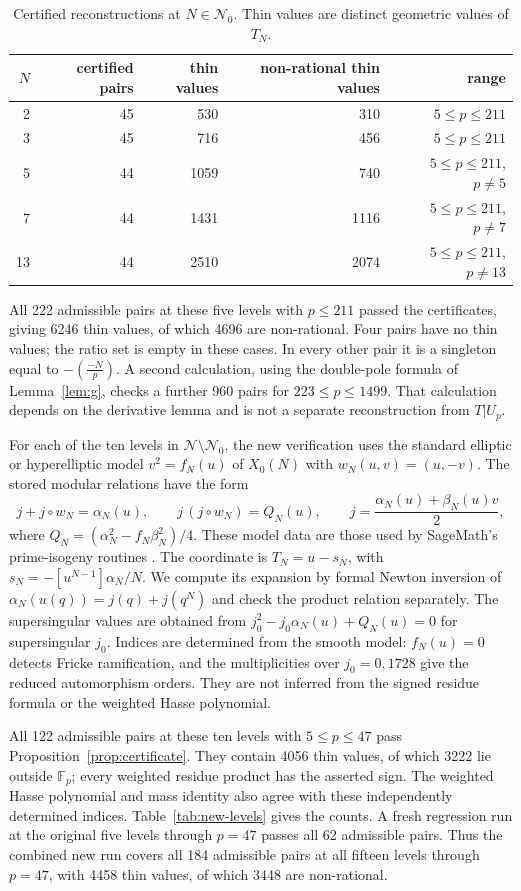 \documentclass[11pt,a4paper]{article}
\numberwithin{equation}{section}
\theoremstyle{definition}
\theoremstyle{remark}
\newcommand{\Fp}{\mathbb F_p}
\begin{document}
\begin{table}[ht]\centering
\begin{tabular}{rrrrr}\toprule
$N$ & certified pairs & thin values & non-rational thin values & range\\\midrule
2 & 45 & 530 & 310 & $5\le p\le211$\\
3 & 45 & 716 & 456 & $5\le p\le211$\\
5 & 44 & 1059 & 740 & $5\le p\le211$, $p\ne5$\\
7 & 44 & 1431 & 1116 & $5\le p\le211$, $p\ne7$\\
13 & 44 & 2510 & 2074 & $5\le p\le211$, $p\ne13$\\\bottomrule
\end{tabular}
\caption{Certified reconstructions at $N\in\mathcal N_0$.
Thin values are distinct geometric values of $T_N$.}
\end{table}

All 222 admissible pairs at these five levels with $p\le211$ passed the certificates, giving 6246 thin
values, of which 4696 are non-rational. Four pairs have no thin values; the ratio
set is empty in these cases. In every other pair it is a singleton equal to
$-\left(\frac{-N}{p}\right)$. A second calculation, using the double-pole formula
of Lemma~\ref{lem:g}, checks a further 960 pairs for $223\le p\le1499$.
That calculation depends on the derivative lemma and is not a separate
reconstruction from $T|U_p$.

For each of the ten levels in $\mathcal N\setminus\mathcal N_0$,
the new verification uses the standard elliptic or hyperelliptic model
$v^2=f_N(u)$ of $X_0(N)$ with $w_N(u,v)=(u,-v)$.
The stored modular relations have the form
\[
j+j\circ w_N=\alpha_N(u),\qquad
j\,(j\circ w_N)=Q_N(u),\qquad
j=\frac{\alpha_N(u)+\beta_N(u)v}{2},
\]
where $Q_N=(\alpha_N^2-f_N\beta_N^2)/4$.
These model data are those used by SageMath's prime-isogeny routines
\citep{SageModels}. The coordinate is $T_N=u-s_N$, with
$s_N=-[u^{N-1}]\alpha_N/N$.
We compute its expansion by formal Newton inversion of
$\alpha_N(u(q))=j(q)+j(q^N)$ and check the product relation separately.
The supersingular values are obtained from
$j_0^2-j_0\alpha_N(u)+Q_N(u)=0$ for supersingular $j_0$.
Indices are determined from the smooth model: $f_N(u)=0$ detects
Fricke ramification, and the multiplicities over $j_0=0,1728$
give the reduced automorphism orders. They are not inferred from
the signed residue formula or the weighted Hasse polynomial.

All 122 admissible pairs at these ten levels with $5\le p\le47$
pass Proposition~\ref{prop:certificate}. They contain 4056 thin values,
of which 3222 lie outside $\Fp$; every weighted residue product has
the asserted sign. The weighted Hasse polynomial and mass identity
also agree with these independently determined indices.
Table~\ref{tab:new-levels} gives the counts.
A fresh regression run at the original five levels through $p=47$
passes all 62 admissible pairs. Thus the combined new run covers all
184 admissible pairs at all fifteen levels through $p=47$, with 4458
thin values, of which 3448 are non-rational.
\end{document}
